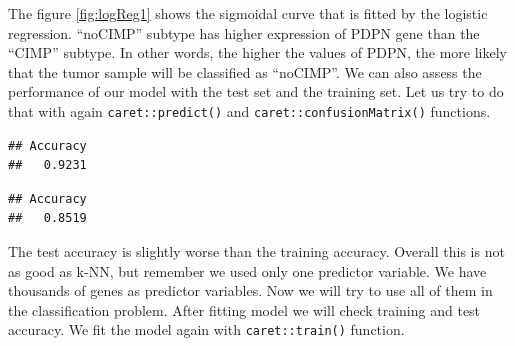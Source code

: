 \documentclass[12pt,]{krantz}
\newenvironment{Shaded}{\begin{snugshade}}{\end{snugshade}}
\newcommand{\CommentTok}[1]{\textcolor[rgb]{0.56,0.35,0.01}{\textit{#1}}}
\newcommand{\DecValTok}[1]{\textcolor[rgb]{0.00,0.00,0.81}{#1}}
\newcommand{\KeywordTok}[1]{\textcolor[rgb]{0.13,0.29,0.53}{\textbf{#1}}}
\newcommand{\NormalTok}[1]{#1}
\newcommand{\OperatorTok}[1]{\textcolor[rgb]{0.81,0.36,0.00}{\textbf{#1}}}
\begin{document}
The figure \ref{fig:logReg1} shows the sigmoidal curve that is fitted by the logistic regression. ``noCIMP'' subtype has higher expression of PDPN gene than the ``CIMP'' subtype. In other words, the higher the values of PDPN, the more likely that the tumor sample will be classified as ``noCIMP''. We can also assess the performance of our model with the test set and the training set. Let us try to do that with again \texttt{caret::predict()} and \texttt{caret::confusionMatrix()} functions.

\begin{Shaded}
\end{Shaded}

\begin{verbatim}
## Accuracy 
##   0.9231
\end{verbatim}

\begin{Shaded}
\end{Shaded}

\begin{verbatim}
## Accuracy 
##   0.8519
\end{verbatim}

The test accuracy is slightly worse than the training accuracy. Overall this is not as good as k-NN, but remember we used only one predictor variable. We have thousands of genes as predictor variables. Now we will try to use all of them in the classification problem. After fitting model we will check training and test accuracy. We fit the model again with \texttt{caret::train()} function.
\end{document}
